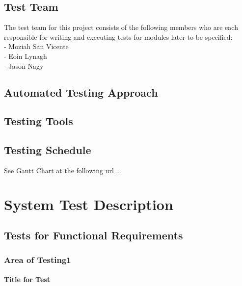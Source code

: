 \documentclass[12pt, titlepage]{article}
\begin{document}
\subsection{Test Team}
The test team for this project consists of the following members who are each responsible for writing and executing tests for modules later to be specified:\\
- Moziah San Vicente\\
- Eoin Lynagh\\
- Jason Nagy\\ %

\subsection{Automated Testing Approach}

\subsection{Testing Tools}

\subsection{Testing Schedule}

See Gantt Chart at the following url ...

\section{System Test Description}

\subsection{Tests for Functional Requirements}

\subsubsection{Area of Testing1}

\paragraph{Title for Test}
\end{document}
